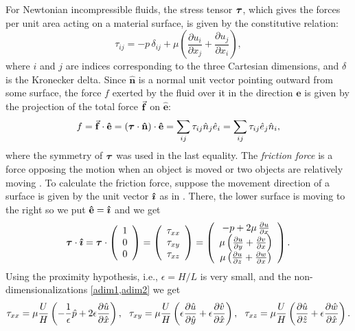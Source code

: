 For Newtonian incompressible fluids, the stress tensor $\boldsymbol{\tau}$, which gives the forces per unit area acting on a material surface, is given by the constitutive relation:
\begin{equation}
\tau_{ij}=-p\,\delta_{ij}+\mu\left(\frac{\partial u_i}{\partial x_j}+\frac{\partial u_j}{\partial x_i}\right),\label{eq:constitutive}
\end{equation}
where $i$ and $j$ are indices corresponding to the three Cartesian dimensions, and  $\delta$ is the Kronecker delta. Since $\mathbf{\hat{n}}$ is a normal unit vector pointing outward from some surface, the force $f$ exerted by the fluid over it in the direction $\mathbf{\hat{e}}$ is given by the projection of the total force $\vec{\mathbf{f}}$ on $\mathbf{\hat{e}}$:
\begin{equation}
f=\vec{\mathbf{f}}\cdot \mathbf{\hat{e}}=(\boldsymbol{\tau}\cdot \mathbf{\hat{n}})\cdot \mathbf{\hat{e}}=\sum_{ij}\tau_{ij}\hat{n}_j\hat{e}_i=\sum_{ij}\tau_{ij}\hat{e}_j\hat{n}_i,
\end{equation}
where the symmetry of $\boldsymbol{\tau}$ was used in the last equality. The \emph{friction force} is a force opposing the motion when an object is moved or two objects are relatively moving \cite{encytribology}. To calculate the friction force, suppose the movement direction of a surface is given by the unit vector $\boldsymbol{\hat{\imath}}$ as in . There, the lower surface is moving to the right so we put $\mathbf{\hat{e}}=\boldsymbol{\hat{\imath}}$ and we get
$$\boldsymbol{\tau} \cdot \boldsymbol{\hat{\imath}}=\boldsymbol{\tau} \cdot 
\left(\begin{array}{c}
1\\
0\\
0
\end{array}\right)=
\left(\begin{array}{c}
\tau_{xx}\\
\tau_{xy}\\
\tau_{xz}
\end{array}\right)
=\left(\begin{array}{c}
-p+2\mu\,\frac{\partial u}{\partial x}\\
\mu \left(\frac{\partial u}{\partial y}+\frac{\partial v}{\partial x}\right)\\
\mu \left(\frac{\partial u}{\partial z}+\frac{\partial w}{\partial x}\right)
\end{array}\right).$$
Using the proximity hypothesis, i.e., $\epsilon=H/L$ is very small, and the non-dimensionalizations \eqref{adim1,adim2} we get
$$\tau_{xx}=\mu\frac{U}{H}\left(-\frac{1}{\epsilon}\hat{p}+2\epsilon\frac{\partial \hat{u}}{\partial \hat{x}}\right),\,\,\,\,\tau_{xy}=\mu \frac{U}{H}\left(\epsilon\frac{\partial \hat{u}}{\partial \hat{y}}+\epsilon\frac{\partial \hat{v}}{\partial \hat{x}}\right),\,\,\,\,\tau_{xz}=\mu \frac{U}{H}\left(\frac{\partial \hat{u}}{\partial \hat{z}}+\epsilon\frac{\partial \hat{w}}{\partial \hat{x}}\right).$$
